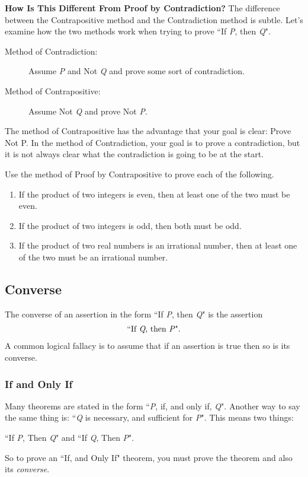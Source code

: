\noindent \textbf{How Is This Different From Proof by Contradiction?}
The difference between the Contrapositive method and the Contradiction method is subtle. Let's examine how the two methods work when trying to prove ``If \textit{P}, then \textit{Q}".
\begin{description}
	\item[Method of Contradiction:] Assume \textit{P} and Not \textit{Q} and prove some sort of contradiction.
	\item[Method of Contrapositive:] Assume Not \textit{Q} and prove Not \textit{P}.
\end{description}
The method of Contrapositive has the advantage that your goal is clear: Prove Not P. In the method of Contradiction, your goal is to prove a contradiction, but it is not always clear what the contradiction is going to be at the start.

\begin{exercise}
	\label{question:ex3}
	Use the method of Proof by Contrapositive to prove each of the following.
	\begin{enumerate}
		\item If the product of two integers is even, then at least one of the two must be even.
		\item If the product of two integers is odd, then both must be odd.
		\item If the product of two real numbers is an irrational number, then at least one of the two must be an irrational number.
	\end{enumerate}
\end{exercise}


\subsection{Converse}
The converse of an assertion in the form ``If \textit{P}, then \textit{Q}" is the assertion
\begin{align*}
	\mbox{``If \textit{Q}, then \textit{P}"}.
\end{align*}
A common logical fallacy is to assume that if an assertion is true then so is its converse.


\subsubsection{If and Only If}
Many theorems are stated in the form ``\textit{P}, if, and only if, \textit{Q}". Another way to say the same thing is: ``\textit{Q} is necessary, and sufficient for \textit{P}". This means two things:
\begin{center}
	``If \textit{P}, Then \textit{Q}" \qquad and \qquad ``If \textit{Q}, Then \textit{P}".
\end{center} So to prove an ``If, and Only If" theorem, you must prove the theorem and also its \textit{converse}.

